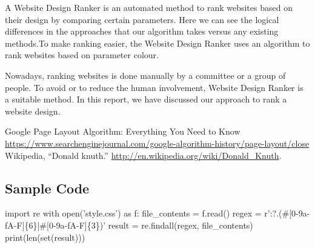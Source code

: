 \documentclass{fisatproject}
\begin{document}
A Website Design Ranker is an automated method to rank websites based on their design by comparing certain parameters. Here we can see the logical differences in the approaches that our algorithm takes versus any existing methods.To make ranking easier, the Website Design Ranker uses an algorithm to rank websites based on parameter colour.

Nowadays, ranking websites is done manually by a committee or a group of people. To avoid or to reduce the human involvement, Website Design Ranker is a suitable method. In this report, we have discussed our approach to rank a website design.



\begin{thebibliography}{1}
 Google Page Layout Algorithm: Everything You Need to
Know
 \url{https://www.searchenginejournal.com/google-algorithm-history/page-layout/close}
 Wikipedia, ``Donald knuth.'' \url{http://en.wikipedia.org/wiki/Donald_Knuth}.
\end{thebibliography}

\begin{appendices}
\chapter{Sample Code}
	import re
	with open('style.css') as f:
	file\_contents = f.read()
	regex = r':?.(\#[0-9a-fA-F]\{6\}|\#[0-9a-fA-F]\{3\})'
	result = re.findall(regex, file\_contents)
	print(len(set(result)))
\begin{lstlisting}[language=c++]

\end{lstlisting}
\end{appendices}
\end{document}
